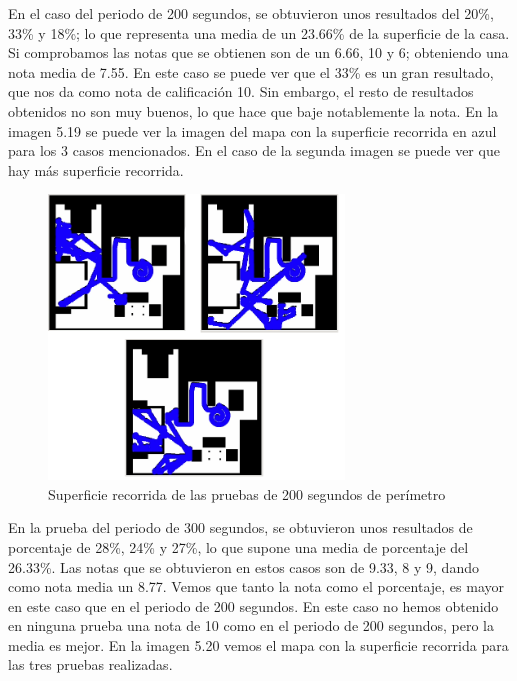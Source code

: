 En el caso del periodo de 200 segundos, se obtuvieron unos resultados del 20\%, 33\% y 18\%; lo que representa una media de un 23.66\% de la superficie de la casa. Si comprobamos las notas que se obtienen son de un 6.66, 10 y 6; obteniendo una nota media de 7.55. En este caso se puede ver que el 33\% es un gran resultado, que nos da como nota de calificación 10. Sin embargo, el resto de resultados obtenidos no son muy buenos, lo que hace que baje notablemente la nota. En la imagen 5.19 se puede ver la imagen del mapa con la superficie recorrida en azul para los 3 casos mencionados. En el caso de la segunda imagen se puede ver que hay más superficie recorrida.\\


\begin{figure}[H]
  \begin{center}
    \includegraphics[width=0.7\textwidth]{figures/Vacuum/Referee200.png}
		\caption{Superficie recorrida de las pruebas de 200 segundos de perímetro}
		\label{fig.Referee200}
		\end{center}
\end{figure}

En la prueba del periodo de 300 segundos, se obtuvieron unos resultados de porcentaje de 28\%, 24\% y 27\%, lo que supone una media de porcentaje del 26.33\%. Las notas que se obtuvieron en estos casos son de 9.33, 8 y 9, dando como nota media un 8.77. Vemos que tanto la nota como el porcentaje, es mayor en este caso que en el periodo de 200 segundos. En este caso no hemos obtenido en ninguna prueba una nota de 10 como en el periodo de 200 segundos, pero la media es mejor. En la imagen 5.20 vemos el mapa con la superficie recorrida para las tres pruebas realizadas.\\

